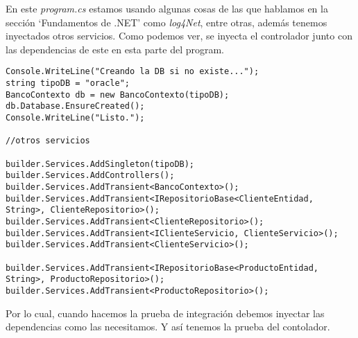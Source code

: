 \documentclass[executivepaper]{article}
\begin{document}
En este \emph{program.cs} estamos usando algunas cosas de las que hablamos en la sección \enquote*{Fundamentos de .NET} como \emph{log4Net}, entre otras, además tenemos inyectados otros servicios. Como podemos ver, se inyecta el controlador junto con las dependencias de este en esta parte del program.

\begin{lstlisting}
Console.WriteLine("Creando la DB si no existe...");
string tipoDB = "oracle";
BancoContexto db = new BancoContexto(tipoDB);
db.Database.EnsureCreated();
Console.WriteLine("Listo.");

//otros servicios

builder.Services.AddSingleton(tipoDB);
builder.Services.AddControllers();
builder.Services.AddTransient<BancoContexto>();
builder.Services.AddTransient<IRepositorioBase<ClienteEntidad, String>, ClienteRepositorio>();
builder.Services.AddTransient<ClienteRepositorio>();
builder.Services.AddTransient<IClienteServicio, ClienteServicio>();
builder.Services.AddTransient<ClienteServicio>();

builder.Services.AddTransient<IRepositorioBase<ProductoEntidad, String>, ProductoRepositorio>();
builder.Services.AddTransient<ProductoRepositorio>();
\end{lstlisting}

Por lo cual, cuando hacemos la prueba de integración debemos inyectar las dependencias como las necesitamos. Y así tenemos la prueba del contolador.
\end{document}
